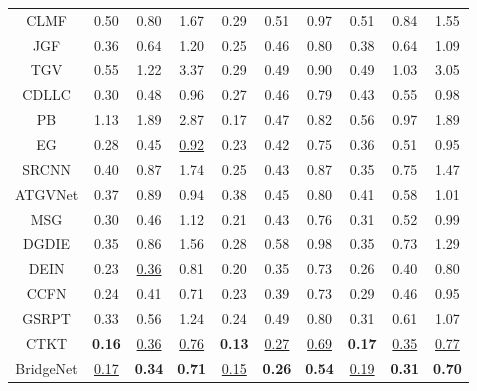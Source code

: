 {\begin{longtable}{c|ccc|ccc|ccc}
CLMF \cite{LuSMLD12}     & 0.50 & 0.80       & 1.67          & 0.29 & 0.51 & 0.97 & 0.51 & 0.84 & 1.55          \\ 
JGF \cite{0001TT13}      & 0.36 & 0.64       & 1.20          & 0.25 & 0.46 & 0.80 & 0.38 & 0.64 & 1.09          \\ 
TGV \cite{DBLP:conf/iccv/FerstlRRRB13}      & 0.55 & 1.22       & 3.37          & 0.29 & 0.49 & 0.90 & 0.49 & 1.03 & 3.05          \\ 
CDLLC \cite{DBLP:conf/icmcs/XieCFS14}   & 0.30 & 0.48       & 0.96          & 0.27 & 0.46 & 0.79 & 0.43 & 0.55 & 0.98          \\ 
PB \cite{DBLP:conf/eccv/AodhaCNB12}      & 1.13 & 1.89       & 2.87          & 0.17 & 0.47 & 0.82 & 0.56 & 0.97 & 1.89          \\ 
EG \cite{DBLP:journals/tip/XieFS16}      & 0.28 & 0.45       & \uline{0.92}    & 0.23 & 0.42 & 0.75 & 0.36 & 0.51 & 0.95          \\ \hline
SRCNN \cite{DBLP:conf/eccv/DongLHT14}   & 0.40 & 0.87       & 1.74          & 0.25 & 0.43 & 0.87 & 0.35 & 0.75 & 1.47          \\
ATGVNet \cite{DBLP:conf/eccv/RieglerRB16} & 0.37 & 0.89       & 0.94          & 0.38 & 0.45 & 0.80 & 0.41 & 0.58 & 1.01 \\
MSG \cite{HuiLT16}    & 0.30 & 0.46       & 1.12          & 0.21 & 0.43 & 0.76 & 0.31 & 0.52 & 0.99          \\
DGDIE \cite{DBLP:conf/cvpr/GuZGCCZ17}   & 0.35 & 0.86       & 1.56          & 0.28 & 0.58 & 0.98 & 0.35 & 0.73 & 1.29          \\
DEIN \cite{DBLP:conf/icassp/YeDL18}      & 0.23 & \uline{0.36} & 0.81 & 0.20 & 0.35 & 0.73 & 0.26 & 0.40 & 0.80          \\
CCFN \cite{WenSLLF19}   & 0.24 & 0.41       & 0.71          & 0.23 & 0.39 & 0.73 & 0.29 & 0.46 & 0.95          \\\bottomrule[1.5pt]
GSRPT \cite{LutioDWS19}   & 0.33 & 0.56       & 1.24          & 0.24 & 0.49 & 0.80 & 0.31 & 0.61 & 1.07          \\
CTKT \cite{Sun2021cvpr}      & \textbf{0.16} & \uline{0.36}    & \uline{0.76}    & \textbf{0.13} & \uline{0.27}    & \uline{0.69}    & \textbf{0.17} & \uline{0.35}    & \uline{0.77}          \\
BridgeNet         & \uline{0.17}    & \textbf{0.34} & \textbf{0.71} & \uline{0.15}    & \textbf{0.26} & \textbf{0.54} & \uline{0.19}    & \textbf{0.31} &  \textbf{0.70}\\
\bottomrule[1.5pt]
\end{longtable}}

